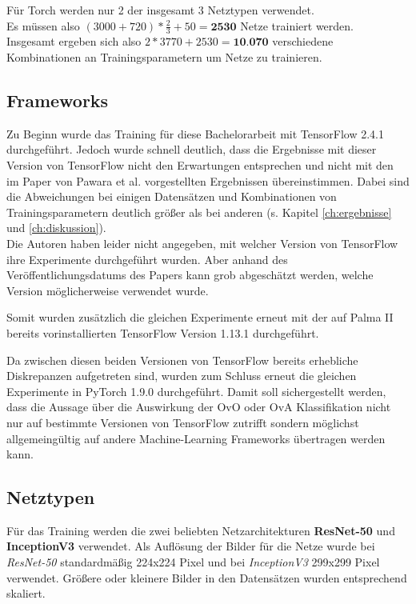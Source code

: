 Für Torch \cite{pytorch} werden nur 2 der insgesamt 3 Netztypen verwendet.\\
Es müssen also $(3000 + 720) * \frac{2}{3} + 50 = \textbf{2530}$ Netze trainiert werden.\\

Insgesamt ergeben sich also $2 * 3770 + 2530 = \textbf{10.070}$ verschiedene Kombinationen an Trainingsparametern um Netze zu trainieren.

\subsection{Frameworks}
Zu Beginn wurde das Training für diese Bachelorarbeit mit TensorFlow 2.4.1 \cite{tensorflow} durchgeführt. Jedoch wurde schnell deutlich, dass die Ergebnisse mit dieser Version von TensorFlow nicht den Erwartungen entsprechen und nicht mit den im Paper von Pawara et al. \cite{pawaraPaper} vorgestellten Ergebnissen übereinstimmen. Dabei sind die Abweichungen bei einigen Datensätzen und Kombinationen von Trainingsparametern deutlich größer als bei anderen (s. Kapitel \ref{ch:ergebnisse} und \ref{ch:diskussion}). \\

Die Autoren haben leider nicht angegeben, mit welcher Version von TensorFlow \cite{tensorflow} ihre Experimente durchgeführt wurden. Aber anhand des Veröffentlichungsdatums des Papers \cite{pawaraPaper} kann grob abgeschätzt werden, welche Version möglicherweise verwendet wurde.

Somit wurden zusätzlich die gleichen Experimente erneut mit der auf Palma II \cite{palma2} bereits vorinstallierten TensorFlow \cite{tensorflow} Version 1.13.1 durchgeführt.

Da zwischen diesen beiden Versionen von TensorFlow \cite{tensorflow} bereits erhebliche Diskrepanzen aufgetreten sind, wurden zum Schluss erneut die gleichen Experimente in PyTorch 1.9.0 \cite{pytorch} durchgeführt.
Damit soll sichergestellt werden, dass die Aussage über die Auswirkung der OvO oder OvA Klassifikation nicht nur auf bestimmte Versionen von TensorFlow \cite{tensorflow} zutrifft sondern möglichst allgemeingültig auf andere Machine-Learning Frameworks übertragen werden kann.


\subsection{Netztypen}
\label{ch:methodik_netze}
Für das Training werden die zwei beliebten Netzarchitekturen \textbf{ResNet-50} und \textbf{InceptionV3} verwendet. Als Auflösung der Bilder für die Netze wurde bei \textit{ResNet-50} standardmäßig 224x224 Pixel und bei \textit{InceptionV3} 299x299 Pixel verwendet. Größere oder kleinere Bilder in den Datensätzen wurden entsprechend skaliert.

